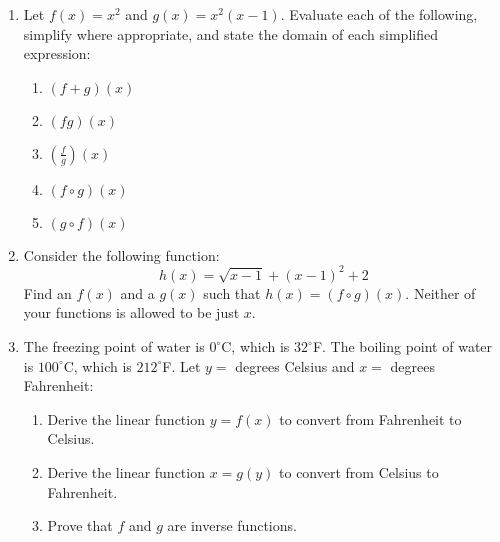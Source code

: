 \documentclass[letterpaper,12pt,fleqn]{article}
\begin{document}
\begin{enumerate}
\item Let $f(x)=x^2$ and $g(x)=x^2(x-1)$. Evaluate each of the following,
  simplify where appropriate, and state the domain of each simplified
  expression:
  \begin{enumerate}
  \item $(f+g)(x)$

    \vspace{2in}
    
  \item $(fg)(x)$

    \newpage
    
  \item $\left(\frac{f}{g}\right)(x)$

    \vspace{2in}
    
  \item $(f\circ g)(x)$

    \vspace{2in}
    
  \item $(g\circ f)(x)$

    \vspace{2in}
    
  \end{enumerate}

\item Consider the following function:
  \[h(x)=\sqrt{x-1}+(x-1)^2+2\]
  Find an $f(x)$ and a $g(x)$ such that $h(x)=(f\circ g)(x)$. Neither of your
  functions is allowed to be just $x$.

  \newpage

\item The freezing point of water is $0^{\circ}$C, which is $32^{\circ}$F. The
  boiling point of water is $100^{\circ}$C, which is $212^{\circ}$F. Let $y=$
  degrees Celsius and $x=$ degrees Fahrenheit:
  \begin{enumerate}
  \item Derive the linear function $y=f(x)$ to convert from Fahrenheit to
    Celsius.

    \vspace{2.5in}
    
  \item Derive the linear function $x=g(y)$ to convert from Celsius to
    Fahrenheit.

    \vspace{2.5in}
    
  \item Prove that $f$ and $g$ are inverse functions.
  \end{enumerate}


\end{enumerate}
\end{document}
